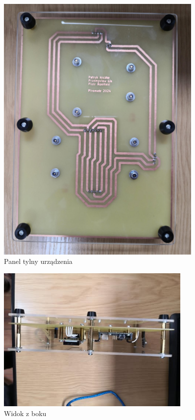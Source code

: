 \begin{figure}[h!]
    \centering
    \includegraphics[width=0.9\textwidth]{images/tyl.jpg}
    \caption{Panel tylny urządzenia}
    \label{fig:panel_gorny}
\end{figure}

\begin{figure}[h!]
    \centering
    \includegraphics[width=0.85\textwidth]{images/bok2.jpg}
    \caption{Widok z boku}
    \label{fig:panel_gorny}
\end{figure}

